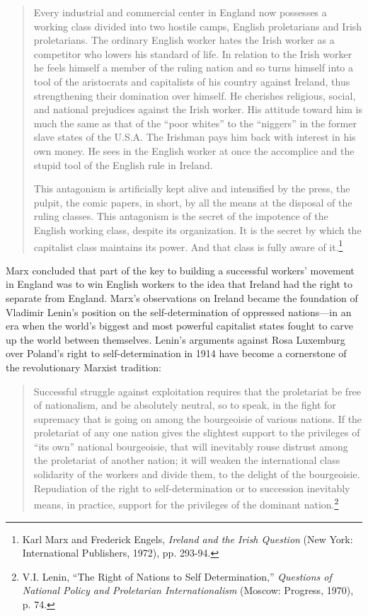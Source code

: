 \blockquote{Every industrial and commercial center in England now possesses a working class divided into two hostile camps, English proletarians and Irish proletarians. The ordinary English worker hates the Irish worker as a competitor who lowers his standard of life. In relation to the Irish worker he feels himself a member of the ruling nation and so turns himself into a tool of the aristocrats and capitalists of his country against Ireland, thus strengthening their domination over himself. He cherishes religious, social, and national prejudices against the Irish worker. His attitude toward him is much the same as that of the ``poor whites'' to the ``niggers'' in the former slave states of the U.S.A. The Irishman pays him back with interest in his own money. He sees in the English worker at once the accomplice and the stupid tool of the English rule in Ireland.

This antagonism is artificially kept alive and intensified by the press, the pulpit, the comic papers, in short, by all the means at the disposal of the ruling classes. This antagonism is the secret of the impotence of the English working class, despite its organization. It is the secret by which the capitalist class maintains its power. And that class is fully aware of it.\footnote{Karl Marx and Frederick Engels, \emph{Ireland and the Irish Question} (New York: International Publishers, 1972), pp. 293-94.}}

Marx concluded that part of the key to building a successful workers' movement in England was to win English workers to the idea that Ireland had the right to separate from England. Marx's observations on Ireland became the foundation of Vladimir Lenin's position on the self-determination of oppressed nations---in an era when the world's biggest and most powerful capitalist states fought to carve up the world between themselves. Lenin's arguments against Rosa Luxemburg over Poland's right to self-determination in 1914 have become a cornerstone of the revolutionary Marxist tradition:

\blockquote{Successful struggle against exploitation requires that the proletariat be free of nationalism, and be absolutely neutral, so to speak, in the fight for supremacy that is going on among the bourgeoisie of various nations. If the proletariat of any one nation gives the slightest support to the privileges of ``its own'' national bourgeoisie, that will inevitably rouse distrust among the proletariat of another nation; it will weaken the international class solidarity of the workers and divide them, to the delight of the bourgeoisie. Repudiation of the right to self-determination or to succession inevitably means, in practice, support for the privileges of the dominant nation.\footnote{V.I. Lenin, ``The Right of Nations to Self Determination,'' \emph{Questions of National Policy and Proletarian Internationalism} (Moscow: Progress, 1970), p. 74.}}

